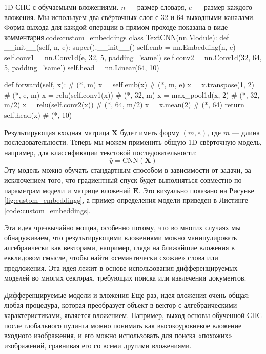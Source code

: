 \begin{mypy}{1D СНС с обучаемыми вложениями. $n$ — размер словаря, $e$ — размер каждого вложения. Мы используем два свёрточных слоя с $32$ и $64$ выходными каналами. Форма выхода для каждой операции в прямом проходе показана в виде комментария.}{code:custom_embeddings}
class TextCNN(nn.Module):
  def __init__(self, n, e):
    super().__init__()
    self.emb = nn.Embedding(n, e)
    self.conv1 = nn.Conv1d(e, 32, 5, padding='same')
    self.conv2 = nn.Conv1d(32, 64, 5, padding='same')
    self.head = nn.Linear(64, 10)

  def forward(self, x):      # (*, m)
    x = self.emb(x)          # (*, m, e)
    x = x.transpose(1, 2)    # (*, e, m)
    x = relu(self.conv1(x))  # (*, 32, m)
    x = max_pool1d(x, 2)     # (*, 32, m/2)
    x = relu(self.conv2(x))  # (*, 64, m/2)
    x = x.mean(2)            # (*, 64)
    return self.head(x)      # (*, 10)
\end{mypy}

Результирующая входная матрица $\mathbf{X}$ будет иметь форму $(m, e)$, где $m$ — длина последовательности. Теперь мы можем применить общую 1D-свёрточную модель, например, для классификации текстовой последовательности:
%
$$
\hat{y}=\text{CNN}(\mathbf{X})
$$
%
Эту модель можно обучать стандартным способом в зависимости от задачи, за исключением того, что градиентный спуск будет выполняться совместно по параметрам модели и матрице вложений $\mathbf{E}$. Это визуально показано на Рисунке \ref{fig:custom_embeddings}, а пример определения модели приведен в Листинге \ref{code:custom_embeddings}.

Эта идея чрезвычайно мощна, особенно потому, что во многих случаях мы обнаруживаем, что результирующими вложениями можно манипулировать алгебраически как векторами, например, глядя на ближайшие вложения в евклидовом смысле, чтобы найти «семантически схожие» слова или предложения. Эта идея лежит в основе использования дифференцируемых моделей во многих секторах, требующих поиска или извлечения документов.

\begin{supportbox}{Дифференцируемые модели и вложения}
Еще раз, идея вложения очень общая: любая процедура, которая преобразует объект в вектор с алгебраическими характеристиками, является вложением. Например, выход основы обученной СНС после глобального пулинга можно понимать как высокоуровневое вложение входного изображения, и его можно использовать для поиска «похожих» изображений, сравнивая его со всеми другими вложениями.
\end{supportbox}


